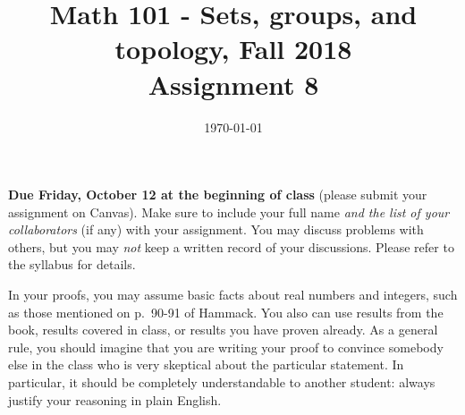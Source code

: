 \documentclass{amsart}
\title[Math 101, Fall 2018: assignment 8]{Math 101 - Sets, groups, and topology, Fall 2018 \\ Assignment 8}
\date{\today}
\theoremstyle{definition}
\begin{document}

\maketitle

\textbf{Due Friday, October 12 at the beginning of class} (please submit your assignment on Canvas). Make sure to include your full name \emph{and the list of your collaborators} (if any) with your assignment. You may discuss problems with others, but you may \emph{not} keep a written record of your discussions. Please refer to the syllabus for details.

In your proofs, you may assume basic facts about real numbers and integers, such as those mentioned on p.~90-91 of Hammack. You also can use results from the book, results covered in class, or results you have proven already. As a general rule, you should imagine that you are writing your proof to convince somebody else in the class who is very skeptical about the particular statement. In particular, it should be completely understandable to another student: always justify your reasoning in plain English. 
\end{document}
